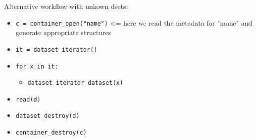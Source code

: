Alternative workflow with unkown dsets:

\begin{itemize}
  \item \lstinline|c = container_open("name")| \textless= here we read the metadata for "name" and generate appropriate structures
  \item \lstinline|it = dataset_iterator()|
  \item \lstinline|for x in it:|
    \begin{itemize}
      \item \lstinline|dataset_iterator_dataset(x)|
    \end{itemize}
  \item \lstinline|read(d)|
  \item \lstinline|dataset_destroy(d)|
  \item \lstinline|container_destroy(c)|
\end{itemize}
